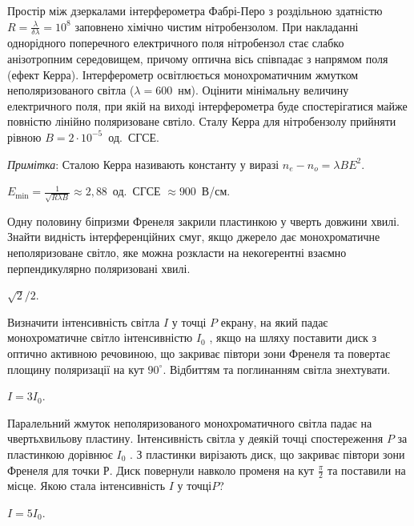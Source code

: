 \begin{problem}%
    Простір між дзеркалами інтерферометра Фабрі-Перо з роздільною здатністю $ R = \frac{\lambda}{\delta\lambda} = 10^8 $ заповнено хімічно чистим нітробензолом. При накладанні однорідного поперечного електричного поля нітробензол стає слабко анізотропним середовищем, причому оптична вісь співпадає з напрямом поля (ефект Керра). Інтерферометр освітлюється монохроматичним жмутком неполяризованого світла ($ \lambda = 600 $~нм). Оцінити мінімальну величину електричного поля, при якій на виході інтерферометра буде спостерігатися майже повністю лінійно поляризоване свтіло. Сталу Керра для нітробензолу прийняти рівною $ B = 2\cdot10^{-5} $~од.~СГСЕ.

    \medskip

    \emph{Примітка}: Сталою Керра називають константу у виразі $ n_e - n_o = \lambda B E^2  $.
    \begin{solution}
        $ E_{\min} = \frac{1}{\sqrt{R\lambda B}} \approx 2,88 $~од.~СГСЕ $ \approx 900 $~В/см.
    \end{solution}
\end{problem}

\begin{problem}%
    Одну половину біпризми Френеля закрили пластинкою у чверть
    довжини хвилі. Знайти видність інтерференційних смуг, якщо джерело
    дає монохроматичне неполяризоване світло, яке можна розкласти на
    некогерентні взаємно перпендикулярно поляризовані хвилі.
    \begin{solution}
        $ \sqrt{2}/2 $.
    \end{solution}
\end{problem}

\begin{problem}%
    Визначити інтенсивність світла $ I $ у точці $ P $ екрану, на який падає монохроматичне світло інтенсивністю $ I_0 $ , якщо на шляху поставити диск з оптично активною речовиною, що закриває півтори зони Френеля та повертає площину поляризації на кут $ 90^\circ $. Відбиттям та поглинанням світла знехтувати.
    \begin{solution}
        $ I = 3I_0 $.
    \end{solution}
\end{problem}

\begin{problem}%
    Паралельний жмуток неполяризованого монохроматичного світла падає на чвертьхвильову пластину. Інтенсивність світла у деякій точці спостереження $ P $ за пластинкою дорівнює $ I_0 $ . З пластинки вирізають диск, що закриває півтори зони Френеля для точки Р. Диск повернули навколо променя на кут $ \frac{\pi}{2} $ та поставили на місце. Якою стала інтенсивність $ I $ у точці$  P $?
    \begin{solution}
        $ I = 5I_0 $.
    \end{solution}
\end{problem}

